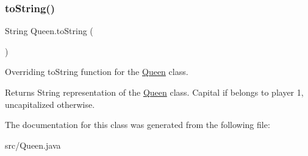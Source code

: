 \subsubsection{\texorpdfstring{to\+String()}{toString()}}
{\footnotesize\ttfamily String Queen.\+to\+String (\begin{DoxyParamCaption}{ }\end{DoxyParamCaption})}

Overriding to\+String function for the \mbox{\hyperlink{class_queen}{Queen}} class. \begin{DoxyReturn}{Returns}
String representation of the \mbox{\hyperlink{class_queen}{Queen}} class. Capital if belongs to player 1, uncapitalized otherwise. 
\end{DoxyReturn}


The documentation for this class was generated from the following file\+:\begin{DoxyCompactItemize}
\item 
src/Queen.\+java\end{DoxyCompactItemize}
